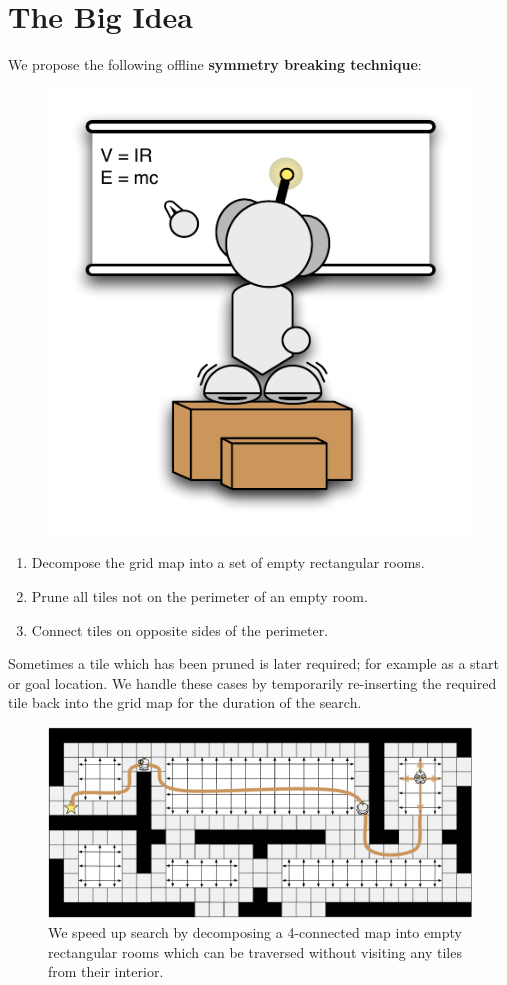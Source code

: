 \section{The Big Idea}
We propose the following offline \textbf{symmetry breaking technique}: 
 \begin{figure}
       \vspace{2em}
		\includegraphics[width=0.25\columnwidth, trim=10mm 10mm 10mm 10mm]{diagrams/robot_whiteboard.pdf}
 \end{figure}
\begin{enumerate}
\item{Decompose the grid map into a set of empty rectangular rooms.}
\item{Prune all tiles not on the perimeter of an empty room.}
\item{Connect tiles on opposite sides of the perimeter.}
\end{enumerate}
Sometimes a tile which has been pruned is later required; for example as a start
or goal location. 
We handle these cases by temporarily re-inserting the 
required tile back into the grid map for the duration of the search.

\begin{figure}[t]
\hspace{0.35in}
\begin{minipage}{17in}
\label{fig:splash}
\begin{center}
\includegraphics[width=17in]{diagrams/robot_map.pdf}
\caption{We speed up search by decomposing a 4-connected map into empty rectangular
rooms which can be traversed without visiting any tiles from their interior.} 
\end{center}
\end{minipage}
\vspace{2em}
\end{figure}

\pagebreak
